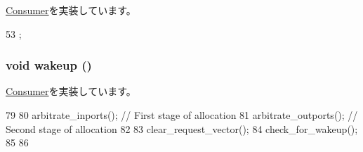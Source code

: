 \hyperlink{classConsumer_a3ea5f7af5db62cc24f4e40df9ea5c971}{Consumer}を実装しています。


\begin{DoxyCode}
53 {};
\end{DoxyCode}
\hypertarget{classSWallocator__d_ae674290a26ecbd622c5160e38e8a4fe9}{
\subsubsection[{wakeup}]{\setlength{\rightskip}{0pt plus 5cm}void wakeup ()}}
\label{classSWallocator__d_ae674290a26ecbd622c5160e38e8a4fe9}


\hyperlink{classConsumer_a623e3e7d1b1c725d70009f7b01a421b9}{Consumer}を実装しています。


\begin{DoxyCode}
79 {
80     arbitrate_inports(); // First stage of allocation
81     arbitrate_outports(); // Second stage of allocation
82 
83     clear_request_vector();
84     check_for_wakeup();
85 
86 }
\end{DoxyCode}



